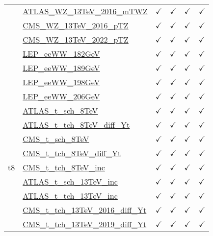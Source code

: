 \documentclass{article}
\begin{document}
\begin{longtable}{|c|l|c|c|c|c|}
 & \href{https://arxiv.org}{ATLAS_WZ_13TeV_2016_mTWZ}  & $\checkmark$ & $\checkmark$ & $\checkmark$ & $\checkmark$\\ \cline{2-6}
 & \href{https://arxiv.org}{CMS_WZ_13TeV_2016_pTZ}  & $\checkmark$ & $\checkmark$ & $\checkmark$ & $\checkmark$\\ \cline{2-6}
 & \href{https://arxiv.org}{CMS_WZ_13TeV_2022_pTZ}  & $\checkmark$ & $\checkmark$ & $\checkmark$ & $\checkmark$\\ \cline{2-6}
 & \href{https://arxiv.org}{LEP_eeWW_182GeV}  & $\checkmark$ & $\checkmark$ & $\checkmark$ & $\checkmark$\\ \cline{2-6}
 & \href{https://arxiv.org}{LEP_eeWW_189GeV}  & $\checkmark$ & $\checkmark$ & $\checkmark$ & $\checkmark$\\ \cline{2-6}
 & \href{https://arxiv.org}{LEP_eeWW_198GeV}  & $\checkmark$ & $\checkmark$ & $\checkmark$ & $\checkmark$\\ \cline{2-6}
 & \href{https://arxiv.org}{LEP_eeWW_206GeV}  & $\checkmark$ & $\checkmark$ & $\checkmark$ & $\checkmark$
\\ \hline
\multirow{10}{*}{t8}
 & \href{https://arxiv.org}{ATLAS_t_sch_8TeV}  & $\checkmark$ & $\checkmark$ & $\checkmark$ & $\checkmark$\\ \cline{2-6}
 & \href{https://arxiv.org}{ATLAS_t_tch_8TeV_diff_Yt}  & $\checkmark$ & $\checkmark$ & $\checkmark$ & $\checkmark$\\ \cline{2-6}
 & \href{https://arxiv.org}{CMS_t_sch_8TeV}  & $\checkmark$ & $\checkmark$ & $\checkmark$ & $\checkmark$\\ \cline{2-6}
 & \href{https://arxiv.org}{CMS_t_tch_8TeV_diff_Yt}  & $\checkmark$ & $\checkmark$ & $\checkmark$ & $\checkmark$\\ \cline{2-6}
 & \href{https://arxiv.org}{CMS_t_tch_8TeV_inc}  & $\checkmark$ & $\checkmark$ & $\checkmark$ & $\checkmark$\\ \cline{2-6}
 & \href{https://arxiv.org}{ATLAS_t_sch_13TeV_inc}  & $\checkmark$ & $\checkmark$ & $\checkmark$ & $\checkmark$\\ \cline{2-6}
 & \href{https://arxiv.org}{ATLAS_t_tch_13TeV_inc}  & $\checkmark$ & $\checkmark$ & $\checkmark$ & $\checkmark$\\ \cline{2-6}
 & \href{https://arxiv.org}{CMS_t_tch_13TeV_2016_diff_Yt}  & $\checkmark$ & $\checkmark$ & $\checkmark$ & $\checkmark$\\ \cline{2-6}
 & \href{https://arxiv.org}{CMS_t_tch_13TeV_2019_diff_Yt}  & $\checkmark$ & $\checkmark$ & $\checkmark$ & $\checkmark$\\ \cline{2-6}

\end{longtable}
\end{document}
